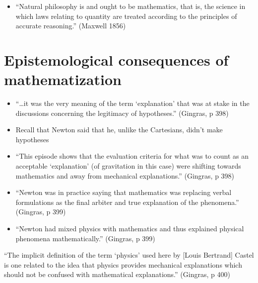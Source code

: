 \documentclass[fleqn]{beamer}
\begin{document}
\begin{frame}

  \begin{itemize}
  \item ``Natural philosophy is and ought to be mathematics, that is,
    the science in which laws relating to quantity are treated
    according to the principles of accurate reasoning.'' (Maxwell
    1856)
  \end{itemize}


\end{frame}

\section{Epistemological consequences of mathematization}

\begin{frame}

  \begin{itemize}
  \item ``\dots it was the very meaning of the term `explanation' that
    was at stake in the discussions concerning the legitimacy of
    hypotheses.'' (Gingras, p 398)
  \item Recall that Newton said that he, unlike the Cartesians, didn't
    make hypotheses
  \item ``This episode shows that the evaluation criteria for what was
    to count as an acceptable `explanation' (of gravitation in this
    case) were shifting towards mathematics and away from mechanical
    explanations.'' (Gingras, p 398)
 \end{itemize}

\end{frame}

\begin{frame}

  \begin{itemize}
  \item ``Newton was in practice saying that mathematics was replacing
    verbal formulations as the final arbiter and true explanation of
    the phenomena.'' (Gingras, p 399)
  \item ``Newton had mixed physics with mathematics and thus explained
    physical phenomena mathematically.'' (Gingras, p 399)
  \end{itemize}
    
\end{frame}

\begin{frame}

  ``The implicit definition of the term `physics' used here by [Louis
  Bertrand] Castel is one related to the idea that physics provides
  mechanical explanations which should not be confused with
  mathematical explanations.'' (Gingras, p 400)
\end{frame}
\end{document}
